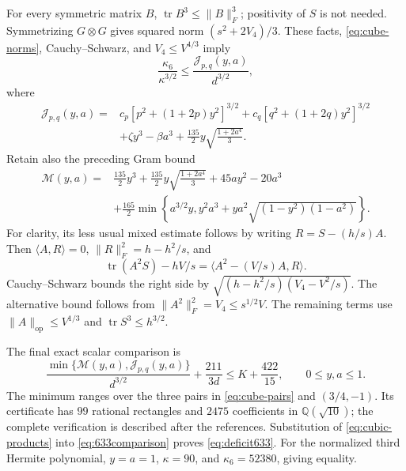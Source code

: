 \documentclass[11pt]{article}
\newcommand{\tr}{\operatorname{tr}}
\newcommand{\ip}[2]{\langle #1,#2\rangle}
\newcommand{\norm}[1]{\lVert #1\rVert}
\begin{document}
For every symmetric matrix $B$, $\tr B^3\le\norm B_F^3$; positivity of $S$ is not needed. Symmetrizing $G\otimes G$ gives squared norm $(s^2+2V_4)/3$. These facts, \eqref{eq:cube-norms}, Cauchy--Schwarz, and $V_4\le V^{4/3}$ imply
\begin{equation}\label{eq:J}
 \frac{\kappa_6}{\kappa^{3/2}}\le\frac{\mathcal J_{p,q}(y,a)}{d^{3/2}},
\end{equation}
where
\begin{equation}\label{eq:Jformula}
\begin{aligned}
 \mathcal J_{p,q}(y,a)={}&
 c_p[p^2+(1+2p)y^2]^{3/2}
 +c_q[q^2+(1+2q)y^2]^{3/2}\\
 &+\zeta y^3-\beta a^3
 +\frac{135}{2}y\sqrt{\frac{1+2a^4}{3}}.
\end{aligned}
\end{equation}
Retain also the preceding Gram bound
\begin{equation}\label{eq:Mformula}
\begin{aligned}
 \mathcal M(y,a)={}&\frac{135}{2}y^3
 +\frac{135}{2}y\sqrt{\frac{1+2a^4}{3}}+45ay^2-20a^3\\
 &+\frac{165}{2}\min\left\{a^{3/2}y,
 y^2a^3+ya^2\sqrt{(1-y^2)(1-a^2)}\right\}.
\end{aligned}
\end{equation}
For clarity, its less usual mixed estimate follows by writing $R=S-(h/s)A$. Then $\ip AR=0$, $\norm R_F^2=h-h^2/s$, and
\begin{equation*}
 \tr(A^2S)-hV/s
 =\ip{A^2-(V/s)A}{R}.
\end{equation*}
Cauchy--Schwarz bounds the right side by
$\sqrt{(h-h^2/s)(V_4-V^2/s)}$. The alternative bound follows from $\norm{A^2}_F^2=V_4\le s^{1/2}V$. The remaining terms use $\norm A_{\mathrm{op}}\le V^{1/3}$ and $\tr S^3\le h^{3/2}$.

The final exact scalar comparison is
\begin{equation}\label{eq:633comparison}
 \frac{\min\{\mathcal M(y,a),\mathcal J_{p,q}(y,a)\}}{d^{3/2}}
 +\frac{211}{3d}\le K+\frac{422}{15},
 \qquad 0\le y,a\le1.
\end{equation}
The minimum ranges over the three pairs in \eqref{eq:cube-pairs} and $(3/4,-1)$. Its certificate has $99$ rational rectangles and $2475$ coefficients in $\mathbb Q(\sqrt{10})$; the complete verification is described after the references. Substitution of \eqref{eq:cubic-products} into \eqref{eq:633comparison} proves \eqref{eq:deficit633}. For the normalized third Hermite polynomial, $y=a=1$, $\kappa=90$, and $\kappa_6=52380$, giving equality.
\end{document}
